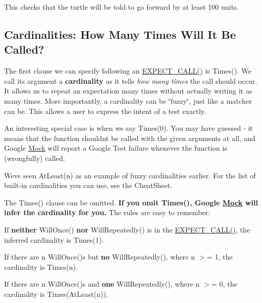 This checks that the turtle will be told to go forward by at least 100 units.

\subsection*{Cardinalities\+: How Many Times Will It Be Called?}

The first clause we can specify following an {\ttfamily \hyperlink{gmock-spec-builders_8h_a535a6156de72c1a2e25a127e38ee5232}{E\+X\+P\+E\+C\+T\+\_\+\+C\+A\+L\+L()}} is {\ttfamily Times()}. We call its argument a {\bfseries cardinality} as it tells {\itshape how many times} the call should occur. It allows us to repeat an expectation many times without actually writing it as many times. More importantly, a cardinality can be \char`\"{}fuzzy\char`\"{}, just like a matcher can be. This allows a user to express the intent of a test exactly.

An interesting special case is when we say {\ttfamily Times(0)}. You may have guessed -\/ it means that the function shouldn\textquotesingle{}t be called with the given arguments at all, and Google \hyperlink{classMock}{Mock} will report a Google Test failure whenever the function is (wrongfully) called.

We\textquotesingle{}ve seen {\ttfamily At\+Least(n)} as an example of fuzzy cardinalities earlier. For the list of built-\/in cardinalities you can use, see the Cheat\+Sheet.

The {\ttfamily Times()} clause can be omitted. {\bfseries If you omit {\ttfamily Times()}, Google \hyperlink{classMock}{Mock} will infer the cardinality for you.} The rules are easy to remember\+:


\begin{DoxyItemize}
\item If {\bfseries neither} {\ttfamily Will\+Once()} {\bfseries nor} {\ttfamily Will\+Repeatedly()} is in the {\ttfamily \hyperlink{gmock-spec-builders_8h_a535a6156de72c1a2e25a127e38ee5232}{E\+X\+P\+E\+C\+T\+\_\+\+C\+A\+L\+L()}}, the inferred cardinality is {\ttfamily Times(1)}.
\item If there are {\ttfamily n Will\+Once()}\textquotesingle{}s but {\bfseries no} {\ttfamily Will\+Repeatedly()}, where {\ttfamily n} $>$= 1, the cardinality is {\ttfamily Times(n)}.
\item If there are {\ttfamily n Will\+Once()}\textquotesingle{}s and {\bfseries one} {\ttfamily Will\+Repeatedly()}, where {\ttfamily n} $>$= 0, the cardinality is {\ttfamily Times(\+At\+Least(n))}.
\end{DoxyItemize}

